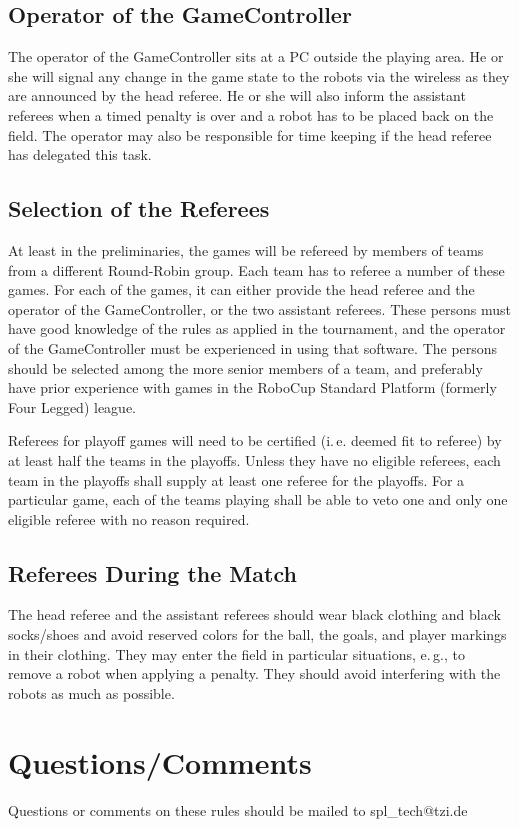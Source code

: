 \documentclass[12pt]{article}
\newcommand{\ie}{\mbox{i.\,e.}\xspace}
\newcommand{\eg}{\mbox{e.\,g.}\xspace}
\begin{document}
\subsection{Operator of the GameController}

The operator of the GameController sits at a PC outside the playing
area. He or she will signal any change in the game state to the
robots via the wireless as they are announced by the head referee.
He or she will also inform the assistant referees when a timed
penalty is over and a robot has to be placed back on the field. The
operator may also be responsible for time keeping if the head
referee has delegated this task.

\subsection{Selection of the Referees}

At least in the preliminaries, the games will be refereed by members
of teams from a different Round-Robin group. Each team has to
referee a number of these games. For each of the games, it can
either provide the head referee and the operator of the
GameController, or the two assistant referees. These persons must
have good knowledge of the rules as applied in the tournament, and
the operator of the GameController must be experienced in using that
software. The persons should be selected among the more senior
members of a team, and preferably have prior experience with games
in the RoboCup Standard Platform (formerly Four Legged) league.

Referees for playoff games will need to be certified (\ie deemed fit to referee)
by at least half the teams in the playoffs. Unless they have no eligible referees,
each team in the playoffs shall supply at least one referee for the playoffs.
For a particular game, each of the teams playing shall be able to veto one
and only one eligible referee with no reason required.

\subsection{Referees During the Match}

The head referee and the assistant referees should wear black
clothing and black socks/shoes and avoid reserved colors for the
ball, the goals, and player markings in their clothing. They may
enter the field in particular situations, \eg, to remove a robot
when applying a penalty. They should avoid interfering with the
robots as much as possible.

\section{Questions/Comments}

Questions or comments on these rules should be mailed to
spl\_tech@tzi.de
\end{document}
